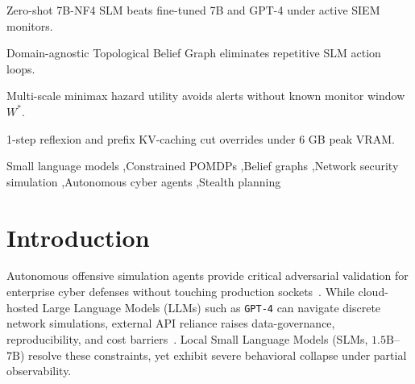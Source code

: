 \documentclass[a4paper,fleqn]{cas-dc}
\begin{document}
\begin{highlights}
\item Zero-shot 7B-NF4 SLM beats fine-tuned 7B and GPT-4 under active SIEM monitors.
\item Domain-agnostic Topological Belief Graph eliminates repetitive SLM action loops.
\item Multi-scale minimax hazard utility avoids alerts without known monitor window $W^*$.
\item 1-step reflexion and prefix KV-caching cut overrides under 6 GB peak VRAM.
\end{highlights}

\begin{keywords}
Small language models \sep Constrained POMDPs \sep Belief graphs \sep Network security simulation \sep Autonomous cyber agents \sep Stealth planning
\end{keywords}

\maketitle

\section{Introduction}
\label{sec:introduction}

Autonomous offensive simulation agents provide critical adversarial validation for enterprise cyber defenses without touching production sockets~\citep{kott2023aica,rigaki2026building}. While cloud-hosted Large Language Models (LLMs) such as \texttt{GPT-4} can navigate discrete network simulations, external API reliance raises data-governance, reproducibility, and cost barriers~\citep{rigaki2026building,subramanian2025slms}. Local Small Language Models (SLMs, $1.5\text{B}$--$7\text{B}$) resolve these constraints, yet exhibit severe behavioral collapse under partial observability.
\end{document}
